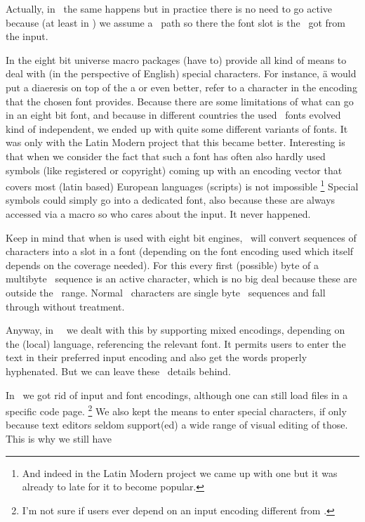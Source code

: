 Actually, in \LUATEX\ the same happens but in practice there is no need to go
active because (at least in \CONTEXT) we assume a \UNICODE\ path so there the
font slot is the \UNICODE\ got from the  input.

In the eight bit universe macro packages (have to) provide all kind of means to
deal with (in the perspective of English) special characters. For instance, \type
{\"a} would put a diaeresis on top of the a or even better, refer to a character
in the encoding that the chosen font provides. Because there are some limitations
of what can go in an eight bit font, and because in different countries the used
\TEX\ fonts evolved kind of independent, we ended up with quite some different
variants of fonts. It was only with the Latin Modern project that this became
better. Interesting is that when we consider the fact that such a font has often
also hardly used symbols (like registered or copyright) coming up with an
encoding vector that covers most (latin based) European languages (scripts) is
not impossible \footnote {And indeed in the Latin Modern project we came up with
one but it was already to late for it to become popular.} Special symbols could
simply go into a dedicated font, also because these are always accessed via a
macro so who cares about the input. It never happened.

Keep in mind that when  is used with eight bit engines, \CONTEXT\ will
convert sequences of characters into a slot in a font (depending on the font
encoding used which itself depends on the coverage needed). For this every first
(possible) byte of a multibyte \UTF\ sequence is an active character, which is no
big deal because these are outside the \ASCII\ range. Normal \ASCII\ characters
are single byte \UTF\ sequences and fall through without treatment.

Anyway, in \CONTEXT\ \MKII\ we dealt with this by supporting mixed encodings,
depending on the (local) language, referencing the relevant font. It permits
users to enter the text in their preferred input encoding and also get the words
properly hyphenated. But we can leave these \MKII\ details behind.

\stopsectionlevel

\startsectionlevel[title=The heritage]

In \MKIV\ we got rid of input and font encodings, although one can still load
files in a specific code page. \footnote {I'm not sure if users ever depend on an
input encoding different from .} We also kept the means to enter special
characters, if only because text editors seldom support(ed) a wide range of
visual editing of those. This is why we still have

